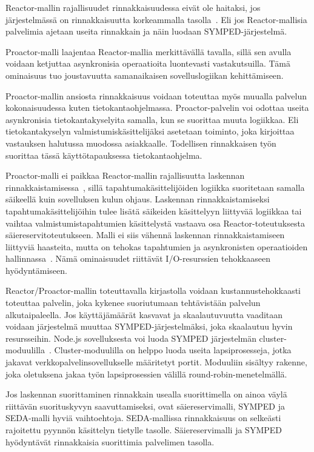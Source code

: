 \documentclass[finnish]{tktltiki2}%
\theoremstyle{definition}
\theoremstyle{remark}
\begin{document}
Reactor-mallin rajallisuudet rinnakkaisuudessa
eivät ole haitaksi, jos järjestelmässä on rinnakkaisuutta
korkeammalla tasolla~\cite{schmidt_reactor:_1995}. Eli
jos Reactor-mallisia palvelimia ajetaan useita rinnakkain
ja näin luodaan SYMPED-järjestelmä.

Proactor-malli laajentaa Reactor-mallia merkittävällä tavalla,
sillä sen avulla voidaan ketjuttaa asynkronisia
operaatioita luontevasti vastakutsuilla. Tämä ominaisuus
tuo joustavuutta samanaikaisen sovelluslogiikan kehittämiseen.

Proactor-mallin ansiosta rinnakkaisuus
voidaan toteuttaa myös 
muualla palvelun kokonaisuudessa kuten tietokantaohjelmassa.
Proactor-palvelin voi odottaa useita asynkronisia
tietokantakyselyita samalla, kun se suorittaa
muuta logiikkaa. Eli tietokantakyselyn valmistumiskäsittelijäksi
asetetaan toiminto, joka kirjoittaa vastauksen
halutussa muodossa asiakkaalle.
Todellisen rinnakkaisen työn
suorittaa tässä käyttötapauksessa tietokantaohjelma.

Proactor-malli ei paikkaa
Reactor-mallin rajallisuutta laskennan rinnakkaistamisessa~\cite{pyarali_proactor_1997},
sillä tapahtumakäsittelijöiden logiikka suoritetaan
samalla säikeellä kuin sovelluksen kulun ohjaus.
Laskennan rinnakkaistamiseksi tapahtumakäsittelijöihin
tulee lisätä säikeiden käsittelyyn liittyvää logiikkaa
tai vaihtaa valmistumistapahtumien käsittelystä vastaava
osa Reactor-toteutuksesta säiereservitoteutukseen.
Malli ei siis vähennä laskennan rinnakkaistamiseen liittyviä
haasteita, mutta on tehokas tapahtumien ja asynkronisten
operaatioiden hallinnassa~\cite{hu_applying_1998}.
Nämä ominaisuudet riittävät
I/O-resurssien tehokkaaseen hyödyntämiseen.

Reactor/Proactor-mallin toteuttavalla
kirjastolla voidaan kustannustehokkaasti
toteuttaa palvelin, joka kykenee suoriutumaan
tehtävistään palvelun alkutaipaleella. Jos
käyttäjämäärät kasvavat ja skaalautuvuutta
vaaditaan voidaan järjestelmä muuttaa SYMPED-järjestelmäksi,
joka skaalautuu hyvin resursseihin.
Node.js sovelluksesta voi luoda SYMPED järjestelmän
cluster-moduulilla~\cite{noauthor_cluster_nodate}.
Cluster-moduulilla on helppo luoda useita lapsiprosesseja,
jotka jakavat verkkopalvelinsovellukselle määritetyt
portit. Moduuliin sisältyy rakenne,
joka oletuksena jakaa työn lapsiprosessien välillä
round-robin-menetelmällä.

Jos laskennan suorittaminen rinnakkain usealla suorittimella
on ainoa väylä riittävän suorituskyvyn saavuttamiseksi,
ovat säiereservimalli, SYMPED ja SEDA-malli hyviä vaihtoehtoja.
SEDA-mallissa rinnakkaisuus on selkeästi rajoitettu
pyynnön käsittelyn tietylle tasolle. Säiereservimalli ja SYMPED
hyödyntävät rinnakkaisia suorittimia palvelimen tasolla.
\end{document}

